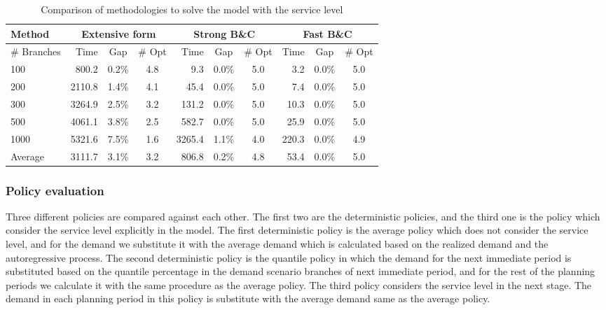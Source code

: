 \documentclass[10pt]{article}
\begin{document}
\begin{table}[]
\caption{Comparison of methodologies to solve the model with the service level}
\label{tab:MethodologyCompare}
\begin{tabular}{lrccrccrcc}
Method      & \multicolumn{3}{c}{Extensive form} & \multicolumn{3}{c}{Strong B\&C} & \multicolumn{3}{c}{Fast B\&C} \\ \hline
\# Branches & Time       & Gap       & \# Opt    & Time      & Gap     & \# Opt   & Time    & Gap     & \# Opt   \\ \hline
100         & 800.2      & 0.2\%     & 4.8       & 9.3       & 0.0\%   & 5.0      & 3.2     & 0.0\%   & 5.0      \\
200         & 2110.8     & 1.4\%     & 4.1       & 45.4      & 0.0\%   & 5.0      & 7.4     & 0.0\%   & 5.0      \\
300         & 3264.9     & 2.5\%     & 3.2       & 131.2     & 0.0\%   & 5.0      & 10.3    & 0.0\%   & 5.0      \\
500         & 4061.1     & 3.8\%     & 2.5       & 582.7     & 0.0\%   & 5.0      & 25.9    & 0.0\%   & 5.0      \\
1000        & 5321.6     & 7.5\%     & 1.6       & 3265.4    & 1.1\%   & 4.0      & 220.3   & 0.0\%   & 4.9      \\ \hline
Average     & 3111.7     & 3.1\%     & 3.2       & 806.8     & 0.2\%   & 4.8      & 53.4    & 0.0\%   & 5.0     
\end{tabular}

\end{table}


\subsubsection{Policy evaluation}

Three different policies are compared against each other. The first two are the deterministic policies, and the third one is the policy which consider the service level explicitly in the model. The first deterministic policy is the average policy which does not consider the service level, and for the demand we substitute it with the average demand which is calculated based on the realized demand and the autoregressive process.
The second deterministic policy is the quantile policy in which the demand for the next immediate period is substituted based on the quantile percentage in the demand scenario branches of next immediate period, and for the rest of the planning periods we calculate it with the same procedure as the average policy.
The third policy considers the service level in the next stage. The demand in each planning period in this policy is substitute with the average demand same as the average policy.
\end{document}
